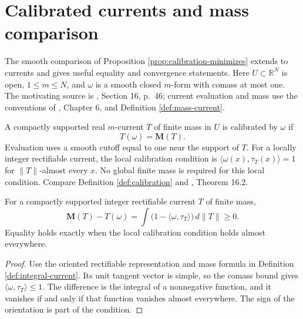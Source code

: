 \chapter{Calibrated currents and mass comparison}\label{sec:calibrated-currents}
The smooth comparison of Proposition \ref{prop:calibration-minimizes} extends to currents and gives useful equality and convergence statements. Here $U\subset\mathbb R^N$ is open, $1\leq m\leq N$, and $\omega$ is a smooth closed $m$-form with comass at most one. The motivating source is \cite{ChMin}, Section 16, p.~46; current evaluation and mass use the conventions of \cite{Sim18}, Chapter 6, and Definition \ref{def:mass-current}.

\begin{definition}\label{def:calibrated-current}
A compactly supported real $m$-current $T$ of finite mass in $U$ is calibrated by $\omega$ if
\[
 T(\omega)=\mathbf M(T).
\]
Evaluation uses a smooth cutoff equal to one near the support of $T$. For a locally integer rectifiable current, the local calibration condition is $\langle\omega(x),\tau_T(x)\rangle=1$ for $\|T\|$-almost every $x$. No global finite mass is required for this local condition. Compare Definition \ref{def:calibration} and \cite{ChMin}, Theorem 16.2.
\end{definition}

\begin{lemma}\label{lem:calibration-defect}
For a compactly supported integer rectifiable current $T$ of finite mass,
\[
 \mathbf M(T)-T(\omega)
 =\int\bigl(1-\langle\omega,\tau_T\rangle\bigr)\,d\|T\|\geq0.
\]
Equality holds exactly when the local calibration condition holds almost everywhere.
\end{lemma}
\begin{proof}
Use the oriented rectifiable representation and mass formula in Definition \ref{def:integral-current}. Its unit tangent vector is simple, so the comass bound gives $\langle\omega,\tau_T\rangle\leq1$. The difference is the integral of a nonnegative function, and it vanishes if and only if that function vanishes almost everywhere. The sign of the orientation is part of the condition.
\end{proof}

